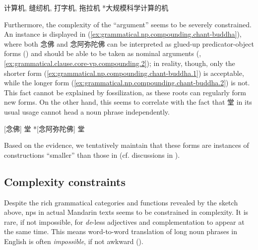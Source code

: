 \documentclass[UTF8, a4paper, oneside, scheme=plain, 12pt]{ctexrep}
\newcommand{\form}[1]{\emph{#1}}
\begin{document}
\begin{exe}
    \ex\label{ex:grammatical.np.complementation.machine}  计算机, 缝纫机, 打字机, 拖拉机
    \ex\label{ex:grammatical.np.complementation.numerical-calculation-machine} *大规模科学计算的机
\end{exe}

Furthermore, the complexity of the ``argument'' seems to be severely constrained.
An instance is displayed in (\ref{ex:grammatical.np.compounding.chant-buddha}),
where both 念佛 and 念阿弥陀佛 can be interpreted as glued-up predicator-object forms ()
and should be able to be taken as nominal arguments
(, \ref{ex:grammatical.clause.core-vp.compounding.2});
in reality, though, only the shorter form (\ref{ex:grammatical.np.compounding.chant-buddha.1}) is acceptable,
while the longer form (\ref{ex:grammatical.np.compounding.chant-buddha.2}) is not.
This fact cannot be explained by fossilization,
as these roots can regularly form new forms.
On the other hand, this seems to correlate with the fact that 堂 in its usual usage cannot head a noun phrase independently.

\begin{exe}
    \ex\label{ex:grammatical.np.compounding.chant-buddha}
    \begin{xlist}
        \ex\label{ex:grammatical.np.compounding.chant-buddha.1} {} [念佛] 堂 
        \ex\label{ex:grammatical.np.compounding.chant-buddha.2} {} *[念阿弥陀佛] 堂 
    \end{xlist}
\end{exe}

Based on the evidence, we tentatively maintain that these forms are instances
of constructions ``smaller'' than those in 
(cf. discussions in ).

\subsection{Complexity constraints}\label{sec:grammatical.np.complexity}

Despite the rich grammatical categories and functions revealed by the sketch above,
\acp{np} in actual Mandarin texts seems to be constrained in complexity.
It is rare, if not impossible, for \form{de}-less adjectives and complementation to appear at the same time.
This means word-to-word translation of long noun phrases in English is often \emph{impossible},
if not awkward ().
\end{document}
